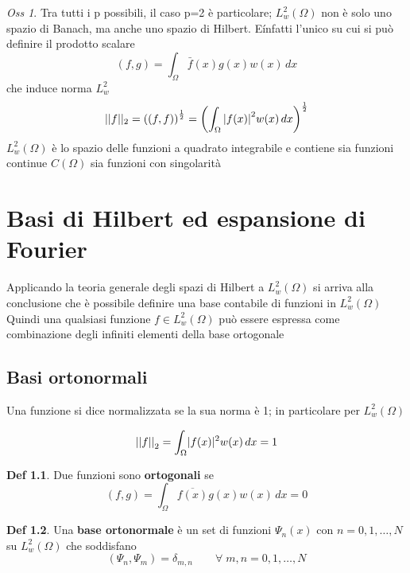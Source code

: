 \documentclass[a4paper,11pt]{report}
\theoremstyle{remark}
\newtheorem*{oss}{Oss}
\theoremstyle{definition}
\newtheorem*{Def}{Def}
\DeclarePairedDelimiter{\abs}{\lvert}{\rvert}
\begin{document}
\begin{oss}
	Tra tutti i p possibili, il caso p=2 è particolare; $L^2_w(\Omega)$ non è solo uno spazio di Banach, ma anche uno spazio di Hilbert. E\' infatti l'unico su cui si può definire il prodotto scalare 
	\[(f,g) = \int_\Omega \bar{f}(x)g(x)w(x) \, dx \]
	che induce norma $L^2_w$
	\[||f||_2 = {((f,f))}^{\frac{1}{2}} = {\left(\int_\Omega {\abs{f(x)}}^2 w(x) \, dx\right)}^{\frac{1}{2}}\]
	$L^2_w(\Omega)$ è lo spazio delle funzioni a quadrato integrabile e contiene sia funzioni continue $C(\Omega)$ sia funzioni con singolarità  
\end{oss}

\chapter{Basi di Hilbert ed espansione di Fourier}

Applicando la teoria generale degli spazi di Hilbert a $L^2_w(\Omega)$ si arriva alla conclusione che è possibile definire una base contabile di funzioni in $L^2_w(\Omega)$ \newline
Quindi una qualsiasi funzione $f\in L^2_w(\Omega)$ può essere espressa come combinazione degli infiniti elementi della base ortogonale

\section{Basi ortonormali}

Una funzione si dice normalizzata se la sua norma è 1; in particolare per $L^2_w(\Omega)$

\begin{equation*}
	\label{eq:1.1}
	{||f||}_2 = \int_\Omega \abs{f(x)}^2w(x) \, dx = 1
\end{equation*}

\begin{Def}
	\label{def:ortogonali}
	Due funzioni sono \textbf{ortogonali} se 
	\begin{equation*}
		(f,g) = \int_\Omega \overline{f(x)}g(x)w(x) \, dx = 0
	\end{equation*}
\end{Def}

\begin{Def}
	\label{def: base ortonormale}
	Una \textbf{base ortonormale} è un set di funzioni $\Psi_n(x)$ con $n = 0,1,\dots,N$ su $L^2_w(\Omega)$ che soddisfano
	\begin{equation*}
		(\Psi_n,\Psi_m) = \delta_{m,n} \qquad \forall \; m,n = 0,1,\dots,N 
	\end{equation*}
\end{Def}
\end{document}
